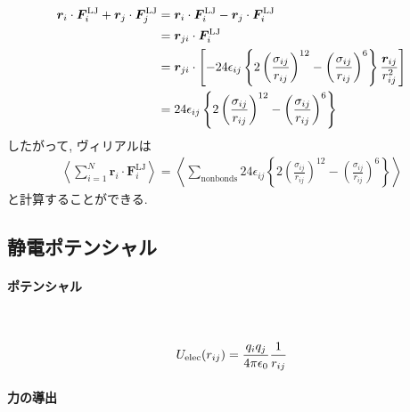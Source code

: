 \begin{align}
    \bm{r}_{i} \cdot \bm{F}_{i}^{\mathrm{LJ}}
   +\bm{r}_{j} \cdot \bm{F}_{j}^{\mathrm{LJ}}
 &=
    \bm{r}_{i} \cdot \bm{F}_{i}^{\mathrm{LJ}}
   -\bm{r}_{j} \cdot \bm{F}_{i}^{\mathrm{LJ}}
 \notag
 \\
 &=
    \bm{r}_{ji} \cdot \bm{F}_{i}^{\mathrm{LJ}}
 \notag
 \\
 &=
    \bm{r}_{ji} \cdot
    \left[
          -24\epsilon_{ij}
          \left\{
                  2\left( \frac{\sigma_{ij}}{r_{ij}} \right)^{12}
                  -\left( \frac{\sigma_{ij}}{r_{ij}} \right)^{6}
          \right\}
          \frac{\bm{r}_{ij}}{r_{ij}^{2}}
    \right]
 \notag
 \\
 &=
     24\epsilon_{ij}
     \left\{
            2\left( \frac{\sigma_{ij}}{r_{ij}} \right)^{12}
            -\left( \frac{\sigma_{ij}}{r_{ij}} \right)^{6}
     \right\}
 \notag
\end{align}
したがって, ヴィリアルは
\begin{align}
   \left\langle
        \sum_{i=1}^{N} \bm{r}_{i} \cdot \bm{F}_{i}^{\mathrm{LJ}}
   \right\rangle
 =
   \left\langle
        \sum_{\mathrm{nonbonds}}24\epsilon_{ij}
        \left\{
               2\left( \frac{\sigma_{ij}}{r_{ij}} \right)^{12}
               -\left( \frac{\sigma_{ij}}{r_{ij}} \right)^{6}
        \right\}
   \right\rangle
\end{align}
と計算することができる. 
\clearpage

\subsection{静電ポテンシャル}
\paragraph{ポテンシャル} \

\begin{equation}
U_{\mathrm{elec}}(r_{ij}) = \frac{q_{i}q_{j}}{4 \pi \epsilon_{0}}
                            \frac{1}{r_{ij}}
\notag                            
\end{equation}

\paragraph{力の導出} \

